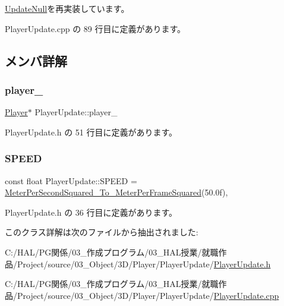 \mbox{\hyperlink{class_update_null_ab3f9cabc6ddcb4ef8743f212c26be144}{Update\+Null}}を再実装しています。



 Player\+Update.\+cpp の 89 行目に定義があります。



\subsection{メンバ詳解}
\mbox{\label{class_player_update_abd75bd3c4e3ecc2863e272a5e14b677f}} 
\subsubsection{\texorpdfstring{player\+\_\+}{player\_}}
{\footnotesize\ttfamily \mbox{\hyperlink{class_player}{Player}}$\ast$ Player\+Update\+::player\+\_\+\hspace{0.3cm}{\ttfamily [private]}}



 Player\+Update.\+h の 51 行目に定義があります。

\mbox{\label{class_player_update_ade4f68ed032e187334cc2e3922e365c5}} 
\subsubsection{\texorpdfstring{S\+P\+E\+ED}{SPEED}}
{\footnotesize\ttfamily const float Player\+Update\+::\+S\+P\+E\+ED = \mbox{\hyperlink{_meter_to_frame_8h_a3a2c155748ceb2eab2a3c303ae48ecc0}{Meter\+Per\+Second\+Squared\+\_\+\+To\+\_\+\+Meter\+Per\+Frame\+Squared}}(50.\+0f)\hspace{0.3cm}{\ttfamily [static]}, {\ttfamily [private]}}



 Player\+Update.\+h の 36 行目に定義があります。



このクラス詳解は次のファイルから抽出されました\+:\begin{DoxyCompactItemize}
\item 
C\+:/\+H\+A\+L/\+P\+G関係/03\+\_\+作成プログラム/03\+\_\+\+H\+A\+L授業/就職作品/\+Project/source/03\+\_\+\+Object/3\+D/\+Player/\+Player\+Update/\mbox{\hyperlink{_player_update_8h}{Player\+Update.\+h}}\item 
C\+:/\+H\+A\+L/\+P\+G関係/03\+\_\+作成プログラム/03\+\_\+\+H\+A\+L授業/就職作品/\+Project/source/03\+\_\+\+Object/3\+D/\+Player/\+Player\+Update/\mbox{\hyperlink{_player_update_8cpp}{Player\+Update.\+cpp}}\end{DoxyCompactItemize}
